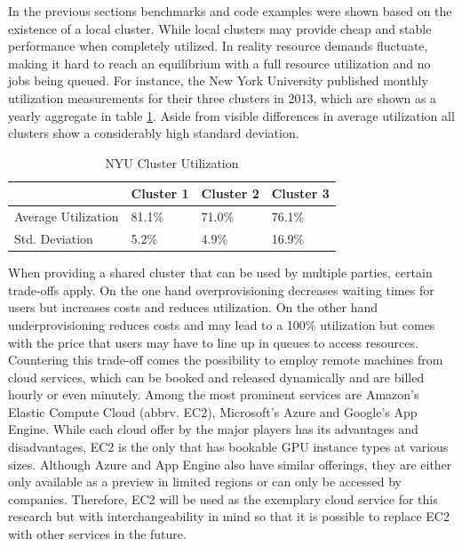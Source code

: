 In the previous sections benchmarks and code examples were shown based on the existence of a local cluster.
While local clusters may provide cheap and stable performance when completely utilized. In reality resource demands fluctuate, making it hard to reach an equilibrium with a full resource utilization and no jobs being queued. For instance, the New York University published monthly utilization measurements for their three clusters in 2013\cite{nyu}, which are shown as a yearly aggregate in table \ref{table:cluster_utilization}. Aside from visible differences in average utilization all clusters show a considerably high standard deviation.

\begin{table}[!htb]
	\centering
	\begin{adjustbox}{width=0.5\textwidth}
		\small
		\begin{tabular}{l | l | l | l}
			~						& Cluster 1	& Cluster 2	& Cluster 3                 \\
			\hline
			Average Utilization 	& 81.1\%  	& 71.0\% 	& 76.1\% \\
			Std. Deviation          & 5.2\%  	& 4.9\%		& 16.9\% \\
		\end{tabular}
	\end{adjustbox}
	
	\caption{NYU Cluster Utilization}
	\label{table:cluster_utilization}
\end{table}

When providing a shared cluster that can be used by multiple parties, certain trade-offs apply. On the one hand overprovisioning decreases waiting times for users but increases costs and reduces utilization. On the other hand underprovisioning reduces costs and may lead to a 100\% utilization but comes with the price that users may have to line up in queues to access resources. Countering this trade-off comes the possibility to employ remote machines from cloud services, which can be booked and released dynamically and are billed hourly or even minutely. Among the most prominent services are Amazon's Elastic Compute Cloud (abbrv. EC2), Microsoft's Azure and Google's App Engine. While each cloud offer by the major players has its advantages and disadvantages, EC2 is the only that has bookable GPU instance types at various sizes. Although Azure and App Engine also have similar offerings, they are either only available as a preview in limited regions or can only be accessed by companies. Therefore, EC2 will be used as the exemplary cloud service for this research but with interchangeability in mind so that it is possible to replace EC2 with other services in the future.

